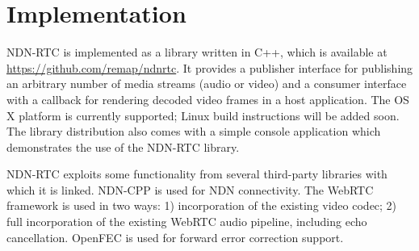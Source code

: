 \documentclass{icn/sig-alternate-2012} %
\newcommand{\ndnrtcName}{NDN-RTC} %
\begin{document}











\section{Implementation}
\label{sec:imp}
\ndnrtcName{} is implemented as a library written in C++, which is available at \url{https://github.com/remap/ndnrtc}. 
It provides a publisher interface for publishing an arbitrary number of media streams (audio or video) and a consumer interface with a callback for rendering decoded video frames in a host application. The OS X platform is currently supported; Linux build instructions will be added soon. 
The library distribution also comes with a simple console application which demonstrates the use of the \ndnrtcName{} library.

\ndnrtcName{} exploits some functionality from several third-party libraries with which it is linked. NDN-CPP \cite{ndnccl} is used for NDN connectivity. The WebRTC framework \cite{webrtc} is used in two ways: 1) incorporation of the existing video codec; 2) full incorporation of the existing WebRTC audio pipeline, including echo cancellation. OpenFEC \cite{openfec} is used for forward error correction support. 
\end{document}
